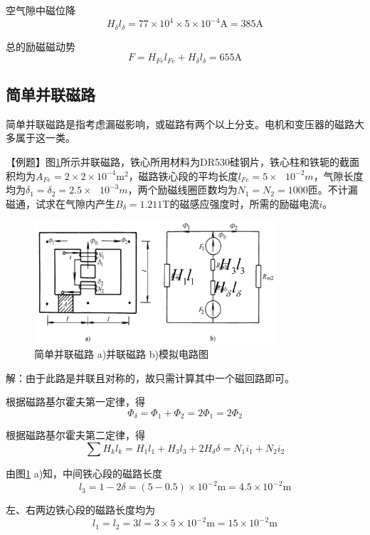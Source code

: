 \documentclass{book}
\begin{document}
空气隙中磁位降 \[{{H}_{\delta }}{{l}_{\delta }}=77\times {{10}^{4}}\times 5\times {{10}^{-4}}\text{A}=385\text{A}\]

总的励磁磁动势 \[F={{H}_{Fe}}{{l}_{Fe}}+{{H}_{\delta }}{{l}_{\delta }}=655\text{A}\]

\subsection{简单并联磁路}
简单并联磁路是指考虑漏磁影响，或磁路有两个以上分支。电机和变压器的磁路大多属于这一类。

【例题】图\ref{fig_bingliandianlu}所示并联磁路，铁心所用材料为DR530硅钢片，铁心柱和铁轭的截面积均为${{A}_{Fe}}=2\times 2\times {{10}^{-4}}{{\text{m}}^{2}}$，磁路铁心段的平均长度${{l}_{Fe}}=5\times \text{ }{{10}^{-2}}m$，气隙长度均为${{\delta }_{1}}={{\delta }_{2}}=2.5\times \text{ }{{10}^{-3}}m$，两个励磁线圈匝数均为${{N}_{1}}={{N}_{2}}=1000$匝。不计漏磁通，试求在气隙内产生${{B}_{\delta }}=1.211\text{T}$的磁感应强度时，所需的励磁电流$i$。
\begin{figure}[H]
	\centering
	\includegraphics[width=0.80\textwidth]{bingliandianlu.png}
	\caption{简单并联磁路 a)并联磁路 b)模拟电路图}
	\label{fig_bingliandianlu}
\end{figure}

解：由于此路是并联且对称的，故只需计算其中一个磁回路即可。

根据磁路基尔霍夫第一定律，得
\[{{\Phi }_{\delta }}={{\Phi }_{1}}+{{\Phi }_{2}}=2{{\Phi }_{1}}=2{{\Phi }_{2}}\]

根据磁路基尔霍夫第二定律，得
\[\sum{{{H}_{k}}{{l}_{k}}}={{H}_{1}}{{l}_{1}}+{{H}_{3}}{{l}_{3}}+2{{H}_{\delta }}\delta ={{N}_{1}}{{i}_{1}}+{{N}_{2}}{{i}_{2}}\]

由图\ref{fig_bingliandianlu} a)知，中间铁心段的磁路长度
\[{{l}_{3}}=1-2\delta =(5-0.5)\times {{10}^{-}}^{2}\text{m}=4.5\times {{10}^{-}}^{2}\text{m}\]

左、右两边铁心段的磁路长度均为
\[{{l}_{1}}={{l}_{2}}=3l=3\times 5\times {{10}^{-}}^{2}\text{m}=15\times {{10}^{-}}^{2}\text{m}\]
\end{document}
